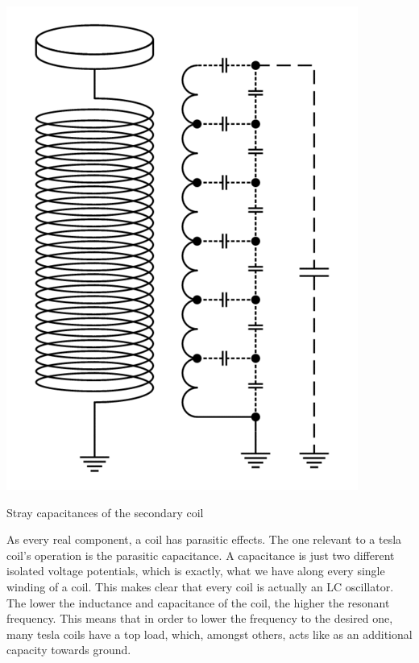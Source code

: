 \begin{marginfigure}[*-5]
\includegraphics[width=\textwidth]{simon/images/teslaCoilStrayCapacitance.png}
\caption{Stray capacitances of the secondary coil}
\end{marginfigure}

As every real component, a coil has parasitic effects. The one relevant to a tesla coil's operation is the parasitic capacitance. A capacitance is just two different isolated voltage potentials, which is exactly, what we have along every single winding of a coil. This makes clear that every coil is actually an LC oscillator. The lower the inductance and capacitance of the coil, the higher the resonant frequency. This means that in order to lower the frequency to the desired one, many tesla coils have a top load, which, amongst others, acts like as an additional capacity towards ground.

